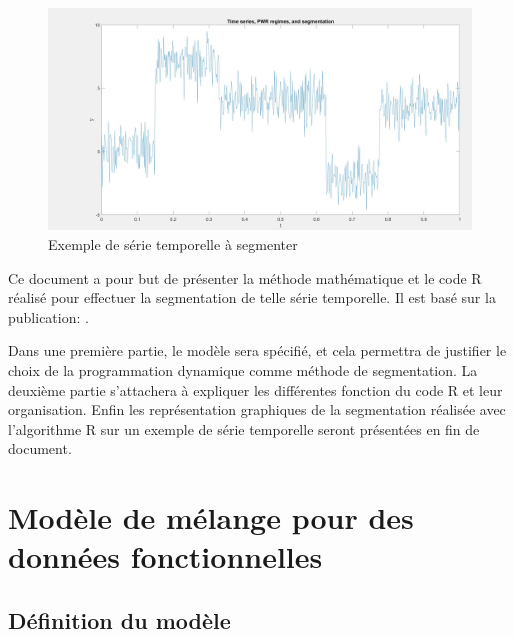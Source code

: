 \documentclass[12pt]{article}
\begin{document}
\begin{figure}[H] 
\centering
\includegraphics[scale=.5]{serietempinit.jpg}
\caption{\label{fig: switch curve example} Exemple de série temporelle à segmenter}
\end{figure} 
%

Ce document a pour but de présenter la méthode mathématique et le code R réalisé pour effectuer la segmentation de telle série temporelle. Il est basé sur la publication:  \cite{RamsayAndSilvermanFDA2005,ramsayandsilvermanAppliedFDA2002,FerratyANDVieuBook}. 

Dans une première partie, le modèle sera spécifié, et cela permettra de justifier le choix de la programmation dynamique comme méthode de segmentation. La deuxième partie s'attachera à expliquer les différentes fonction du code R et leur organisation. Enfin les représentation graphiques de la segmentation réalisée avec l'algorithme R sur un exemple de série temporelle seront présentées en fin de document.


\section{Modèle de mélange pour des données fonctionnelles}
\label{sec: FMM formulation for FDA}


\subsection{Définition du modèle}
\label{ssec: def1}
\smallbreak
\end{document}
